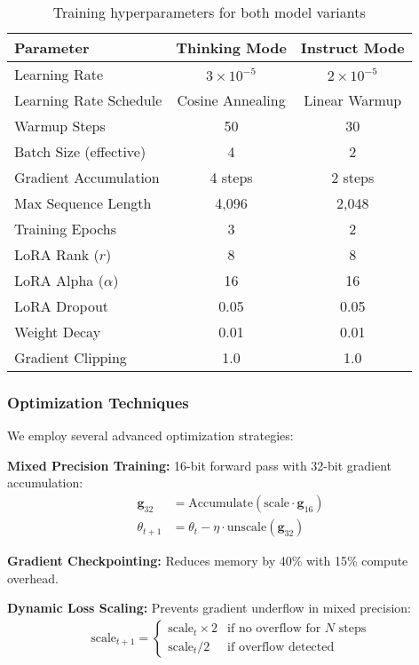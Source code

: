 \begin{table}[H]
\centering
\begin{tabular}{lcc}
\toprule
Parameter & Thinking Mode & Instruct Mode \\
\midrule
Learning Rate & $3 \times 10^{-5}$ & $2 \times 10^{-5}$ \\
Learning Rate Schedule & Cosine Annealing & Linear Warmup \\
Warmup Steps & 50 & 30 \\
Batch Size (effective) & 4 & 2 \\
Gradient Accumulation & 4 steps & 2 steps \\
Max Sequence Length & 4,096 & 2,048 \\
Training Epochs & 3 & 2 \\
LoRA Rank ($r$) & 8 & 8 \\
LoRA Alpha ($\alpha$) & 16 & 16 \\
LoRA Dropout & 0.05 & 0.05 \\
Weight Decay & 0.01 & 0.01 \\
Gradient Clipping & 1.0 & 1.0 \\
\bottomrule
\end{tabular}
\caption{Training hyperparameters for both model variants}
\label{tab:training-hyperparams}
\end{table}

\subsubsection{Optimization Techniques}
We employ several advanced optimization strategies:

\textbf{Mixed Precision Training:} 16-bit forward pass with 32-bit gradient accumulation:
\begin{align}
\mathbf{g}_{32} &= \text{Accumulate}(\text{scale} \cdot \mathbf{g}_{16}) \\
\theta_{t+1} &= \theta_t - \eta \cdot \text{unscale}(\mathbf{g}_{32})
\end{align}

\textbf{Gradient Checkpointing:} Reduces memory by 40\% with 15\% compute overhead.

\textbf{Dynamic Loss Scaling:} Prevents gradient underflow in mixed precision:
\begin{align}
\text{scale}_{t+1} = \begin{cases}
\text{scale}_t \times 2 & \text{if no overflow for } N \text{ steps} \\
\text{scale}_t / 2 & \text{if overflow detected}
\end{cases}
\end{align}

